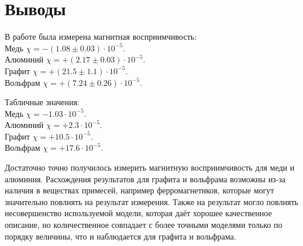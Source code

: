 \section*{Выводы}

В работе была измерена магнитная восприимчивость: \\
Медь $\chi = -(1.08 \pm 0.03) \cdot 10^{-5}$. \\
Алюминий $\chi = +(2.17 \pm 0.03) \cdot 10^{-5}$. \\
Графит $\chi = +(21.5 \pm 1.1) \cdot 10^{-5}$. \\
Вольфрам $\chi = +(7.24 \pm 0.26) \cdot 10^{-5}$.

Табличные значения: \\
Медь $\chi = -1.03 \cdot 10^{-5}$. \\
Алюминий $\chi = +2.3 \cdot 10^{-5}$. \\
Графит $\chi = +10.5 \cdot 10^{-5}$. \\
Вольфрам $\chi = +17.6 \cdot 10^{-5}$.

Достаточно точно получилось измерить магнитную восприимчивость для меди и алюминия. Расхождения результатов для графита и вольфрама возможны из-за наличия в веществах примесей, например ферромагнетиков, которые могут значительно повлиять на результат измерения. Также на результат могло повлиять несовершенство используемой модели, которая даёт хорошее качественное описание, но количественное совпадает с более точными моделями только по порядку величины, что и наблюдается для графита и вольфрама.